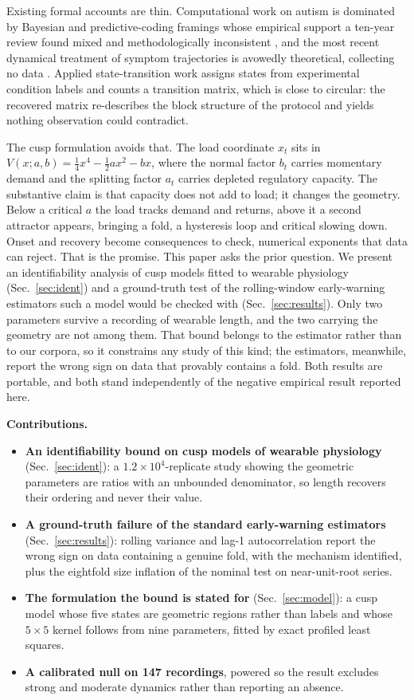 \documentclass[conference]{IEEEtran}
\begin{document}
Existing formal accounts are thin. Computational work on autism is dominated
by Bayesian and predictive-coding framings whose empirical support a ten-year
review found mixed and methodologically inconsistent \cite{chrysaitis2023}, and
the most recent dynamical treatment of symptom trajectories is avowedly
theoretical, collecting no data \cite{adamou2026}. Applied state-transition
work assigns states from experimental condition labels and counts a transition
matrix, which is close to circular: the recovered matrix re-describes the block
structure of the protocol and yields nothing observation could contradict.

The cusp formulation avoids that. The load coordinate $x_t$ sits in
$V(x;a,b)=\tfrac14 x^4-\tfrac12 a x^2-bx$, where the normal factor $b_t$
carries momentary demand and the splitting factor $a_t$ carries depleted
regulatory capacity. The substantive claim is that capacity does not add to
load; it changes the geometry. Below a critical $a$ the load tracks demand and
returns, above it a second attractor appears, bringing a fold, a hysteresis
loop and critical slowing down. Onset and recovery become consequences to
check, numerical exponents that data can reject. That is the promise. This paper asks the prior question. We present an identifiability analysis of cusp models fitted to wearable
physiology (Sec.~\ref{sec:ident}) and a ground-truth test of the rolling-window
early-warning estimators such a model would be checked with
(Sec.~\ref{sec:results}). Only two parameters survive a recording of
wearable length, and the two carrying the geometry are not among them. That
bound belongs to the estimator rather than to our corpora, so it constrains any
study of this kind; the estimators, meanwhile, report the wrong sign on data
that provably contains a fold. Both results are portable, and both stand
independently of the negative empirical result reported here.

\noindent\textbf{Contributions.}
\begin{itemize}[leftmargin=1.2em,itemsep=2pt,topsep=3pt,parsep=0pt]
\item \textbf{An identifiability bound on cusp models of wearable
  physiology} (Sec.~\ref{sec:ident}): a $1.2\times10^{4}$-replicate study
  showing the geometric parameters are ratios with an unbounded denominator, so
  length recovers their ordering and never their value.
\item \textbf{A ground-truth failure of the standard early-warning estimators}
  (Sec.~\ref{sec:results}): rolling variance and lag-1 autocorrelation report
  the wrong sign on data containing a genuine fold, with the mechanism
  identified, plus the eightfold size inflation of the nominal test on
  near-unit-root series.
\item \textbf{The formulation the bound is stated for} (Sec.~\ref{sec:model}):
  a cusp model whose five states are geometric regions rather than labels and
  whose $5\times5$ kernel follows from nine parameters, fitted by exact
  profiled least squares.
\item \textbf{A calibrated null on 147 recordings}, powered so the result
  excludes strong and moderate dynamics rather than reporting an absence.
\end{itemize}
\end{document}
